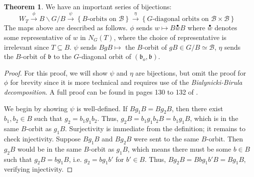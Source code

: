 \documentclass[11pt]{article}
\theoremstyle{definition}
\newtheorem{theorem}[equation]{Theorem}
\numberwithin{equation}{section} %
\begin{document}
\begin{theorem}
    We have an important series of bijections:
    $$
    W_T \overset{\phi}\to B\backslash G/B \overset{\psi}\to \left\{B\text{-orbits on }\mathcal{B}\right\}\overset{\eta}\to \left\{G\text{-diagonal orbits on }\mathcal{B}\times \mathcal{B}\right\}
    $$
    The maps above are described as follows. $\phi$ sends $w\mapsto B\overset{\bullet}{w}B$ where $\overset{\bullet}{w}$ denotes some representative of $w$ in $N_G(T)$, where the choice of representative is irrelevant since $T\subseteq B$. $\psi$ sends $BgB\mapsto$ the $B$-orbit of $gB\in G/B \simeq \mathcal{B}$, $\eta$ sends the $B$-orbit of $\mathfrak{b}$ to the $G$-diagonal orbit of $\left(\mathfrak{b}_o, \mathfrak{b}\right)$.
\end{theorem}

\begin{proof}
    For this proof, we will show $\psi$ and $\eta$ are bijections, but omit the proof for $\phi$ for brevity since it is more technical and requires use of the \emph{Bialynicki-Birula decomposition}. A full proof can be found in pages 130 to 132 of \cite{ChrissGinzburg2010RepresentationTheoryComplexGeometry}.
    
    \smallskip
    
    \noindent We begin by showing $\psi$ is well-defined. If $Bg_1B = Bg_2B$, then there exist $b_1, b_2\in B$ such that $g_2 = b_1g_1b_2$. Thus, $g_2B = b_1g_1b_2B = b_1g_1B$, which is in the same $B$-orbit as $g_1B$. Surjectivity is immediate from the definition; it remains to check injectivity. Suppose $Bg_1B$ and $Bg_2 B$ were sent to the same $B$-orbit. Then $g_2B$ would be in the same $B$-orbit as $g_1B$, which means there must be some $b\in B$ such that $g_2B = bg_1B$, i.e. $g_2 = bg_1b'$ for $b'\in B$. Thus, $Bg_2B = Bbg_1b'B = Bg_1B$, verifying injectivity.

    \smallskip


\end{proof}
\end{document}
